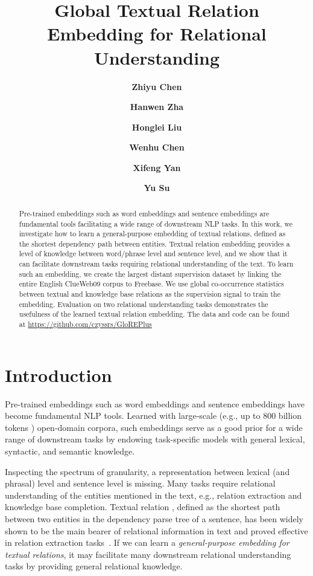 \documentclass[11pt,a4paper]{article}
\title{Global Textual Relation Embedding for Relational Understanding}
\author[1]{\textbf{Zhiyu Chen}}
\author[1]{\textbf{Hanwen Zha}}
\author[1]{\textbf{Honglei Liu}}
\author[1]{\textbf{Wenhu Chen}}
\author[1]{\textbf{Xifeng Yan}}
\author[2]{\textbf{Yu Su}}
\affil[1]{University of California, Santa Barbara, CA, USA}
\affil[2]{The Ohio State University, OH, USA \authorcr \{zhiyuchen, hwzha, honglei, wenhuchen, xyan\}@cs.ucsb.edu, su.809@osu.edu}
\date{}
\begin{document}
\maketitle

\begin{abstract}
Pre-trained embeddings such as word embeddings and sentence embeddings are fundamental tools facilitating a wide range of downstream NLP tasks. In this work, we investigate how to learn a general-purpose embedding of textual relations, defined as the shortest dependency path between entities. 
Textual relation embedding provides a level of knowledge between word/phrase level and sentence level, and we show that it can facilitate downstream tasks requiring relational understanding of the text. To learn such an embedding, we create the largest distant supervision dataset by linking the entire English ClueWeb09 corpus to Freebase. We use global co-occurrence statistics between textual and knowledge base relations as the supervision signal to train the embedding. Evaluation on two relational understanding tasks demonstrates the usefulness of the learned textual relation embedding. The data and code can be found at \href{https://github.com/czyssrs/GloREPlus}{https://github.com/czyssrs/GloREPlus}

\end{abstract}  \section{Introduction}
\label{sec:introduction}

Pre-trained embeddings such as word embeddings \cite{mikolov2013distributed,pennington2014glove,peters2018deep,devlin2018bert} and sentence embeddings \cite{le2014distributed,kiros2015skip} have become fundamental NLP tools. 
Learned with large-scale (e.g., up to 800 billion tokens \cite{pennington2014glove}) open-domain corpora, such embeddings serve as a good prior for a wide range of downstream tasks by endowing task-specific models with general lexical, syntactic, and semantic knowledge.

Inspecting the spectrum of granularity, a representation between lexical (and phrasal) level and sentence level is missing. 
Many tasks require relational understanding of the entities mentioned in the text, e.g., relation extraction and knowledge base completion. 
Textual relation \cite{bunescu2005shortest}, defined as the shortest path between two entities in the dependency parse tree of a sentence, has been widely shown to be the main bearer of relational information in text and proved effective in relation extraction tasks~\cite{xu2015classifying,su2017global}. 
If we can learn a \textit{general-purpose embedding for textual relations}, it may facilitate many downstream relational understanding tasks by providing general relational knowledge.
\end{document}
